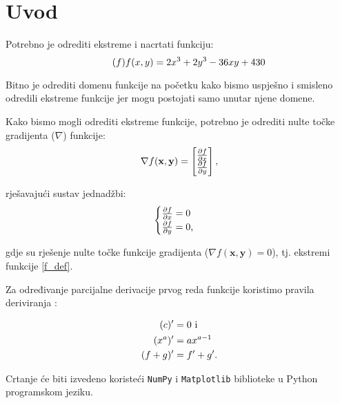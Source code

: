 \chapter{Uvod}

Potrebno je odrediti ekstreme i nacrtati funkciju:
\begin{equation}
    \tag{\hspace{0pt}{$f$}\hspace{0pt}}
    \label{f_def}
    f(x, y) = 2x^3 + 2y^3 - 36xy + 430
\end{equation}

Bitno je odrediti domenu funkcije na početku kako bismo uspješno i smisleno odredili ekstreme funkcije jer mogu postojati samo unutar njene domene.

Kako bismo mogli odrediti ekstreme funkcije, potrebno je odrediti nulte točke gradijenta ($\nabla$) funkcije\cite{ccalc}:
\begin{equation}
    \label{del_f}
    \nabla f(\mathbf{x}, \mathbf{y}) = \begin{bmatrix}
        \frac{\partial f}{\partial x} \\
        \frac{\partial f}{\partial y}
    \end{bmatrix}\textnormal{,}
\end{equation}

rješavajući sustav jednadžbi:
\begin{equation}
    \label{del_f_sys}
    \begin{cases}
        \frac{\partial f}{\partial x} = 0 \\
        \frac{\partial f}{\partial y} = 0 \textnormal{,}
    \end{cases}
\end{equation}

gdje su rješenje nulte točke funkcije gradijenta ($\nabla f(\mathbf{x}, \mathbf{y}) = 0$), tj. ekstremi funkcije \eqref{f_def}.

Za određivanje parcijalne derivacije prvog reda funkcije koristimo pravila deriviranja \cite{kolegij}:

\begin{align}
    (c)' &= 0 \text{ i } \label{rule_const} \\
    (x^a)' &= ax^{a-1} \label{rule_exp} \\
    (f + g)' &= f' + g' \label{rule_sum} \textnormal{.}
\end{align}

\vspace*{20pt}

Crtanje će biti izvedeno koristeći \verb|NumPy| i \verb|Matplotlib| biblioteke u Python programskom jeziku.\par

\newpage
